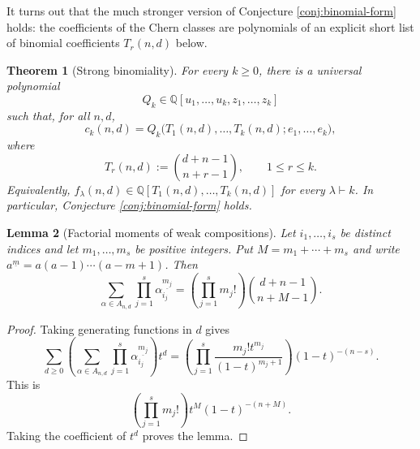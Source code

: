 \documentclass[10pt,a4paper]{amsart}
\numberwithin{equation}{section}
\newtheorem{theorem}{Theorem}[section]
\newtheorem{lemma}[theorem]{Lemma}
\newcommand{\Q}{\mathbb Q}
\begin{document}
It turns out that the much stronger version of Conjecture \ref{conj:binomial-form} holds: the coefficients of the Chern classes are polynomials of an explicit short list of binomial coefficients $T_r(n,d)$ below. 

\begin{theorem}[Strong binomiality]\label{thm:strong-binomiality}
For every $k\ge0$, there is a universal polynomial
\[
  Q_k\in\Q[u_1,\ldots,u_k,z_1,\ldots,z_k]
\]
such that, for all $n,d$,
\[
  c_k(n,d)=Q_k\bigl(T_1(n,d),\ldots,T_k(n,d);e_1,\ldots,e_k\bigr),
\]
where
\[
  T_r(n,d):=\binom{d+n-1}{n+r-1},\qquad 1\le r\le k.
\]
Equivalently, $f_\lambda(n,d)\in\Q[T_1(n,d),\ldots,T_k(n,d)]$ for every $\lambda\vdash k$.  In particular, Conjecture \ref{conj:binomial-form} holds.
\end{theorem}

\begin{lemma}[Factorial moments of weak compositions]\label{lem:factorial-moments}
Let $i_1,\ldots,i_s$ be distinct indices and let $m_1,\ldots,m_s$ be positive integers.  Put $M=m_1+\cdots+m_s$ and write $a^{\underline m}=a(a-1)\cdots(a-m+1)$.  Then
\begin{equation}\label{eq:factorial-moments}
  \sum_{\alpha\in A_{n,d}}\prod_{j=1}^s \alpha_{i_j}^{\underline {m_j}}
  =
  \left(\prod_{j=1}^s m_j!\right)\binom{d+n-1}{n+M-1}.
\end{equation}
\end{lemma}

\begin{proof}
Taking generating functions in $d$ gives
\[
  \sum_{d\ge0}\left(\sum_{\alpha\in A_{n,d}}\prod_{j=1}^s \alpha_{i_j}^{\underline {m_j}}\right)t^d
  =
  \left(\prod_{j=1}^s\frac{m_j!t^{m_j}}{(1-t)^{m_j+1}}\right)(1-t)^{-(n-s)}.
\]
This is
\[
  \left(\prod_{j=1}^s m_j!\right)t^M(1-t)^{-(n+M)}.
\]
Taking the coefficient of $t^d$ proves the lemma.
\end{proof}
\end{document}

